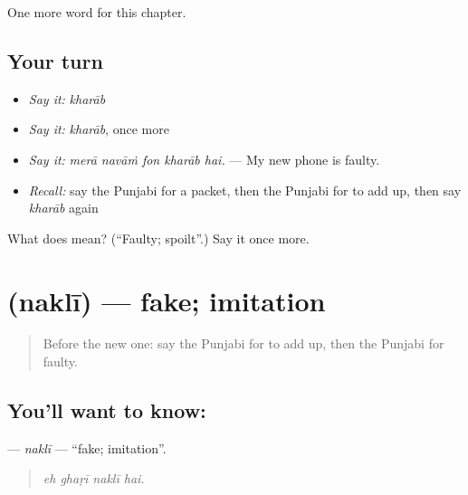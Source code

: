 \begin{grammarlens}[title={What you've built}]
One more word for this chapter.
\end{grammarlens}

\subsection*{Your turn}
\begin{itemize}
\raggedright
  \item \emph{Say it:} \emph{kharāb}
  \item \emph{Say it:} \emph{kharāb}, once more
  \item \emph{Say it:} \emph{merā navāṁ fon kharāb hai.} — My new phone is faulty.
  \item \emph{Recall:} say the Punjabi for a packet, then the Punjabi for to add up, then say \emph{kharāb} again
\end{itemize}

\begin{tcolorbox}[breakable,colback=teal!4,colframe=teal!35!black,title={Before you move on}]
What does  mean? (\textquotedblleft{}Faulty; spoilt\textquotedblright{}.) Say it once more.
\end{tcolorbox}
\section[\texorpdfstring{\pa{ਨਕਲੀ} (naklī)}{ਨਕਲੀ (naklī)}]{ (naklī) — fake; imitation}

\label{lesson:PA-C279-nakli}



\begin{quote}
Before the new one: say the Punjabi for to add up, then the Punjabi for faulty.
\end{quote}

\subsection*{You'll want to know: }
\textbf{} — \emph{naklī} — \textquotedblleft{}fake; imitation\textquotedblright{}.

\begin{quote}
   
\end{quote}

\begin{quote}
\emph{eh ghaṛī naklī hai.}
\end{quote}

